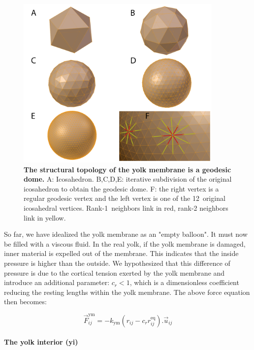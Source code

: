 \begin{figure}
\begin{center}
\includegraphics[width=0.9\textwidth]{../../images/Cases_Studies/Case_0_Yolk/blender/all_gl_zoom_letter.png}
\end{center}
\caption{\textbf{The structural topology of the yolk membrane is a geodesic dome.} A: Icosahedron. B,C,D,E: iterative subdivision of the original icosahedron to obtain the geodesic dome. F: the right vertex is a regular geodesic vertex and the left vertex is one of the 12 original icosahedral vertices. Rank-1 neighbors link in red, rank-2 neighbors link in yellow.}
\label{Case_0_Yolk_blender_all_gl_zoom}
\end{figure}

So far, we have idealized the yolk membrane as an "empty balloon". It must now be filled with a viscous fluid. In the real yolk, if the yolk membrane is damaged, inner material is expelled out of the membrane. This indicates that the inside pressure is higher than the outside. We hypothesized that this difference of pressure is due to the cortical tension exerted by the yolk membrane and introduce an additional parameter: $c_r \lt 1$, which is a dimensionless coefficient reducing the resting lengths within the yolk membrane. The above force equation then becomes:

$$ \vec{F}^{\mathrm{ym}}_{ij} = -k_{\mathrm{ym}} (r_{ij} - c_r r^{\mathrm{eq}}_{ij}).\vec{u}_{ij} $$

\paragraph{The yolk interior (yi)}


